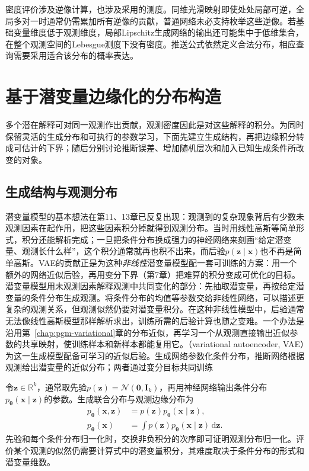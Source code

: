 密度评价涉及逆像计算，也涉及采用的测度。同维光滑映射即使处处局部可逆，全局多对一时通常仍需累加所有逆像的贡献，普通网络未必支持枚举这些逆像。若基础变量维度低于观测维度，局部Lipschitz生成网络的输出还可能集中于低维集合，在整个观测空间的Lebesgue测度下没有密度。推送公式依然定义合法分布，相应查询需要采用适合该分布的概率表达。

\section{基于潜变量边缘化的分布构造}

\label{sec:pgm-generative-vae}

多个潜在解释可对同一观测作出贡献，观测密度因此是对这些解释的积分。为同时保留灵活的生成分布和可执行的参数学习，下面先建立生成结构，再把边缘积分转成可估计的下界；随后分别讨论推断误差、增加随机层次和加入已知生成条件所改变的对象。

\subsection{生成结构与观测分布}

\label{sec:pgm-generative-latent-model}

潜变量模型的基本想法在第11、13章已反复出现：观测到的复杂现象背后有少数未观测因素在起作用，把这些因素积分掉就得到观测分布。当时用线性高斯等简单形式，积分还能解析完成；一旦把条件分布换成强力的神经网络来刻画“给定潜变量、观测长什么样”，这个积分通常就再也积不出来，而后验$p(\bm z\mid\bm x)$也不再是简单高斯。VAE的贡献正是为这种\emph{非线性}潜变量模型配一套可训练的方案：用一个额外的网络近似后验，再用变分下界（第7章）把难算的积分变成可优化的目标。潜变量模型用未观测因素解释观测中共同变化的部分：先抽取潜变量，再按给定潜变量的条件分布生成观测。将条件分布的均值等参数交给非线性网络，可以描述更复杂的观测关系，但观测似然仍要对潜变量积分。在这种非线性模型中，后验通常无法像线性高斯模型那样解析求出，训练所需的后验计算也随之变难。一个办法是沿用第~\ref{chap:pgm-variational}章的分布近似，再学习一个从观测直接输出近似参数的共享映射，使训练样本和新样本都能复用它。（variational autoencoder, VAE）为这一生成模型配备可学习的近似后验。生成网络参数化条件分布，推断网络根据观测给出潜变量的近似分布；两者通过变分目标共同训练

令$\bm{z}\in\mathbb{R}^{k}$，通常取先验$p(\bm{z})=\mathcal{N}(\bm{0},\bm{I}_k)$，再用神经网络输出条件分布$p_{\bm{\theta}}(\bm{x}\mid\bm{z})$的参数。生成联合分布与观测边缘分布为
\begin{equation}
  \label{eq:pgm-generative-vae-joint}
  \begin{aligned}
    p_{\bm{\theta}}(\bm{x},\bm{z})
      &=p(\bm{z})p_{\bm{\theta}}(\bm{x}\mid\bm{z}),\\
    p_{\bm{\theta}}(\bm{x})
      &=\int p(\bm{z})p_{\bm{\theta}}(\bm{x}\mid\bm{z})
          \,\mathrm{d}\bm{z}.
  \end{aligned}
\end{equation}
先验和每个条件分布归一化时，交换非负积分的次序即可证明观测分布归一化。评价某个观测的似然仍需要计算式中的潜变量积分，其难度取决于条件分布的形式和潜变量维数。

